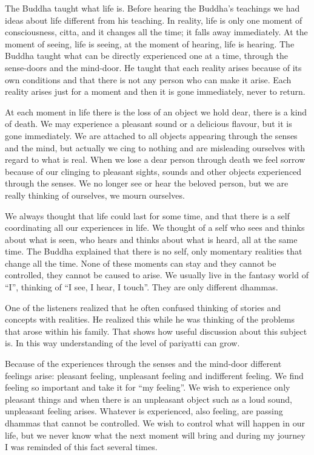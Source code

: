 The Buddha taught what life is. Before hearing the Buddha's
teachings we had ideas about life different from his teaching. In
reality, life is only one moment of consciousness, citta, and it changes
all the time; it falls away immediately. At the moment of seeing, life
is seeing, at the moment of hearing, life is hearing. The Buddha taught
what can be directly experienced one at a time, through the sense-doors
and the mind-door. He taught that each reality arises because of its own
conditions and that there is not any person who can make it arise. Each
reality arises just for a moment and then it is gone immediately, never
to return.

At each moment in life there is the loss of an object we hold
dear, there is a kind of death. We may experience a pleasant sound or a
delicious flavour, but it is gone immediately. We are attached to all
objects appearing through the senses and the mind, but actually we cing
to nothing and are misleading ourselves with regard to what is real.
When we lose a dear person through death we feel sorrow because of our
clinging to pleasant sights, sounds and other objects experienced
through the senses. We no longer see or hear the beloved person, but we
are really thinking of ourselves, we mourn ourselves. 

We always thought that life could last for some time, and
that there is a self coordinating all our experiences in life. We
thought of a self who sees and thinks about what is seen, who hears and
thinks about what is heard, all at the same time. The Buddha explained
that there is no self, only momentary realities that change all the
time. None of these moments can stay and they cannot be controlled, they
cannot be caused to arise. We usually live in the fantasy world of
``I'', thinking of ``I see, I hear, I touch''. They are only different
dhammas. 

One of the listeners realized that he often confused thinking
of stories and concepts with realities. He realized this while he was
thinking of the problems that arose within his family. That shows how
useful discussion about this subject is. In this way understanding of
the level of pariyatti can grow. 

Because of the experiences through the senses and the
mind-door different feelings arise: pleasant feeling, unpleasant feeling
and indifferent feeling. We find feeling so important and take it for
``my feeling''. We wish to experience only pleasant things and when
there is an unpleasant object such as a loud sound, unpleasant feeling
arises. Whatever is experienced, also feeling, are passing dhammas that
cannot be controlled. We wish to control what will happen in our life,
but we never know what the next moment will bring and during my journey
I was reminded of this fact several times. 

